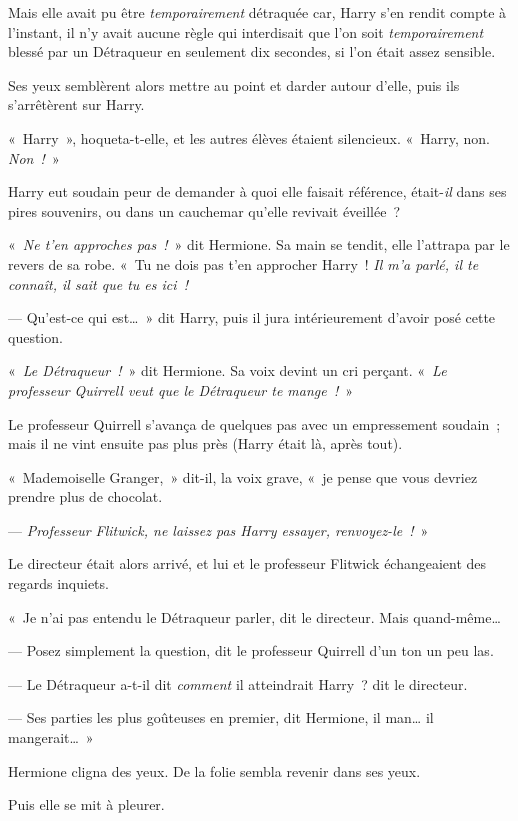 Mais elle avait pu être \emph{temporairement} détraquée car, Harry s'en rendit compte à l'instant, il n'y avait aucune règle qui interdisait que l'on soit \emph{temporairement} blessé par un Détraqueur en seulement dix secondes, si l'on était assez sensible.

Ses yeux semblèrent alors mettre au point et darder autour d'elle, puis ils s'arrêtèrent sur Harry.

«~Harry~», hoqueta-t-elle, et les autres élèves étaient silencieux.
«~Harry, non.
\emph{Non~!}~»

Harry eut soudain peur de demander à quoi elle faisait référence, était-\emph{il} dans ses pires souvenirs, ou dans un cauchemar qu'elle revivait éveillée~?

«~\emph{Ne t'en approches pas~!}~» dit Hermione.
Sa main se tendit, elle l'attrapa par le revers de sa robe.
«~Tu ne dois pas t'en approcher Harry~!
\emph{Il m'a parlé, il te connaît, il sait que tu es ici~!}

--- Qu'est-ce qui est…~»
dit Harry, puis il jura intérieurement d'avoir posé cette question.

«~\emph{Le Détraqueur~!}~» dit Hermione.
Sa voix devint un cri perçant.
«~\emph{Le professeur Quirrell veut que le Détraqueur te mange~!}~»

Le professeur Quirrell s'avança de quelques pas avec un empressement soudain~; mais il ne vint ensuite pas plus près (Harry était là, après tout).

«~Mademoiselle Granger,~» dit-il, la voix grave, «~je pense que vous devriez prendre plus de chocolat.

--- \emph{Professeur Flitwick, ne laissez pas Harry essayer, renvoyez-le~!}~»

Le directeur était alors arrivé, et lui et le professeur Flitwick échangeaient des regards inquiets.

«~Je n'ai pas entendu le Détraqueur parler, dit le directeur.
Mais quand-même…

--- Posez simplement la question, dit le professeur Quirrell d'un ton un peu las.

--- Le Détraqueur a-t-il dit \emph{comment} il atteindrait Harry~? dit le directeur.

--- Ses parties les plus goûteuses en premier, dit Hermione, il man… il mangerait…~»

Hermione cligna des yeux.
De la folie sembla revenir dans ses yeux.

Puis elle se mit à pleurer.

